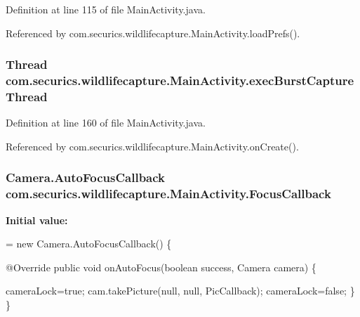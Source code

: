 Definition at line 115 of file Main\+Activity.\+java.



Referenced by com.\+securics.\+wildlifecapture.\+Main\+Activity.\+load\+Prefs().

\subsubsection[{exec\+Burst\+Capture\+Thread}]{\setlength{\rightskip}{0pt plus 5cm}Thread com.\+securics.\+wildlifecapture.\+Main\+Activity.\+exec\+Burst\+Capture\+Thread\hspace{0.3cm}{\ttfamily [private]}}\label{classcom_1_1securics_1_1wildlifecapture_1_1_main_activity_a88e4c3d9685a6aec123636bcf32ad27b}


Definition at line 160 of file Main\+Activity.\+java.



Referenced by com.\+securics.\+wildlifecapture.\+Main\+Activity.\+on\+Create().

\subsubsection[{Focus\+Callback}]{\setlength{\rightskip}{0pt plus 5cm}Camera.\+Auto\+Focus\+Callback com.\+securics.\+wildlifecapture.\+Main\+Activity.\+Focus\+Callback\hspace{0.3cm}{\ttfamily [private]}}\label{classcom_1_1securics_1_1wildlifecapture_1_1_main_activity_aa4d0bbbea77a09171efeb2d6b500ad85}
{\bfseries Initial value\+:}
\begin{DoxyCode}
= \textcolor{keyword}{new} Camera.AutoFocusCallback() \{

        @Override
        \textcolor{keyword}{public} \textcolor{keywordtype}{void} onAutoFocus(\textcolor{keywordtype}{boolean} success, Camera camera) \{
            
            
            cameraLock=\textcolor{keyword}{true};
            cam.takePicture(null, null, PicCallback);
            cameraLock=\textcolor{keyword}{false};
        \}
    \}
\end{DoxyCode}


